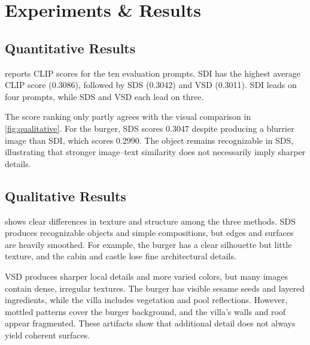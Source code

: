 \section{Experiments \& Results}
\label{sec:exp}
%


\subsection{Quantitative Results}
\label{sec:quantitative}



 reports CLIP scores for the ten evaluation prompts.
SDI has the highest average CLIP score (0.3086), followed by SDS (0.3042) and VSD (0.3011).
SDI leads on four prompts, while SDS and VSD each lead on three.

The score ranking only partly agrees with the visual comparison in \cref{fig:qualitative}.
For the burger, SDS scores 0.3047 despite producing a blurrier image than SDI, which scores 0.2990.
The object remains recognizable in SDS, illustrating that stronger image--text similarity does not
necessarily imply sharper details.

\subsection{Qualitative Results}
\label{sec:qualitative}

 shows clear differences in texture and structure among the three methods.
SDS produces recognizable objects and simple compositions, but edges and surfaces are heavily
smoothed.
For example, the burger has a clear silhouette but little texture, and the cabin and castle lose
fine architectural details.

VSD produces sharper local details and more varied colors, but many images contain dense, irregular
textures.
The burger has visible sesame seeds and layered ingredients, while the villa includes vegetation and
pool reflections.
However, mottled patterns cover the burger background, and the villa's walls and roof appear
fragmented.
These artifacts show that additional detail does not always yield coherent surfaces.

